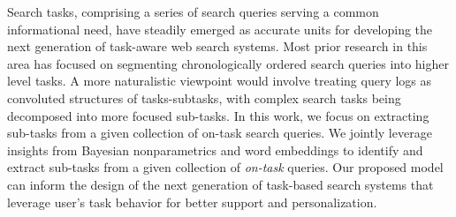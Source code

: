 Search tasks, comprising a series of search queries serving a common informational need, have steadily emerged as accurate units for developing the next generation of task-aware web search systems. Most prior research in this area has focused on segmenting chronologically ordered search queries into higher level tasks. A more naturalistic viewpoint would involve treating query logs as convoluted structures of tasks-subtasks, with complex search tasks being decomposed into more focused sub-tasks. In this work, we focus on extracting sub-tasks from a given collection of on-task search queries. We jointly leverage insights from Bayesian nonparametrics and word embeddings to identify and extract sub-tasks from a given collection of \textit{on-task} queries. Our proposed model can inform the design of the next generation of task-based search systems that leverage user's task behavior for better support and personalization.
